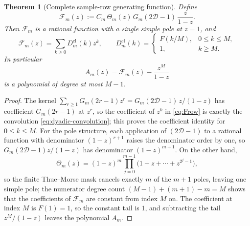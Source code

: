 \documentclass[11pt,oneside]{article}
\numberwithin{equation}{section}
\newtheorem{theorem}{Theorem}[section]
\theoremstyle{definition}
\theoremstyle{remark}
\newcommand{\Dop}{\mathcal D}
\newcommand{\ThetaTM}{\Theta}
\newcommand{\Frow}{\mathscr F}
\newcommand{\ClampedDyadicSample}{D^{\mathrm{cl}}}
\begin{document}
\begin{theorem}[Complete sample-row generating function]
\label{thm:row-ogf}
Define
\begin{equation}
 \Frow_m(z)
 :=C_m\,\ThetaTM_m(z)\,G_m(2\Dop-1)\,\frac{z}{1-z}.
 \label{eq:Frow}
\end{equation}
Then $\Frow_m$ is a rational function with a single simple pole at
$z=1$, and
\begin{equation}
 \Frow_m(z)=\sum_{k\ge0}\ClampedDyadicSample_m(k)z^{k},
 \qquad
 \ClampedDyadicSample_m(k)=
 \begin{cases}
 F(k/M),&0\le k\le M,\\
 1,&k\ge M.
 \end{cases}
 \label{eq:Frow-coeff}
\end{equation}
In particular
\begin{equation}
 \boxed{\;
 A_m(z)=\Frow_m(z)-\frac{z^{M}}{1-z}
 \;}
 \label{eq:AN-from-Frow}
\end{equation}
is a polynomial of degree at most $M-1$.
\end{theorem}

\begin{proof}
The kernel $\sum_{r\ge1}G_m(2r-1)z^{r}=G_m(2\Dop-1)\,z/(1-z)$ has
coefficient $G_m(2r-1)$ at $z^r$, so the coefficient of $z^k$ in
\eqref{eq:Frow} is exactly the convolution
\eqref{eq:dyadic-convolution}; this proves the coefficient identity for
$0\le k\le M$.  For the pole structure, each application of
$(2\Dop-1)$ to a rational function with denominator $(1-z)^{r+1}$
raises the denominator order by one, so
$G_m(2\Dop-1)z/(1-z)$ has denominator $(1-z)^{m+1}$.  On the other
hand,
\begin{equation}
 \ThetaTM_m(z)=(1-z)^{m}
 \prod_{j=0}^{m-1}\bigl(1+z+\cdots+z^{2^{j}-1}\bigr),
 \label{eq:theta-factor}
\end{equation}
so the finite Thue--Morse mask cancels exactly $m$ of the $m+1$ poles,
leaving one simple pole; the numerator degree count
$(M-1)+(m+1)-m=M$ shows that the coefficients of $\Frow_m$ are constant
from index $M$ on.  The coefficient at index $M$ is $F(1)=1$, so the
constant tail is $1$, and subtracting the tail $z^{M}/(1-z)$ leaves the
polynomial $A_m$.
\end{proof}
\end{document}
